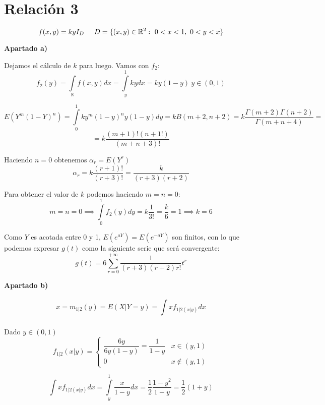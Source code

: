 \documentclass[openany]{book}
\begin{document}
\chapter{Relación 3}

\begin{exercise}
    $$ f (x,y) = k y I_{D}\hspace{5mm} D = \{(x,y) \in \mathbb{R}^2:\ 0<x<1,\ 0<y<x\} $$
    
    \begin{flushright}
        \textbf{Apartado a)}
    \end{flushright}


    Dejamos el cálculo de $ k $ para luego. Vamos con $ f_{2} $:
    $$ f_{2}(y) = \int\limits_{\mathbb{R}}^{}f(x,y)dx = \int\limits_{y}^{1} ky dx = ky(1-y)\ y \in (0,1) $$

    $$ E(Y^{m}(1-Y)^{n}) = \int\limits_{0}^{1}k y ^{m}(1-y)^{n} y (1-y)dy = kB(m+2,n+2) = k \dfrac{\Gamma(m+2)\Gamma(n+2)}{\Gamma(m+n+4)} = $$
    $$ = k \dfrac{(m+1)!(n+1!)}{(m+n+3)!} $$

    Haciendo $ n = 0 $ obtenemos $ \alpha_{r} = E(Y^{r}) $
    $$ \alpha_{r} = k \dfrac{(r+1)!}{(r+3)!} = \dfrac{k}{(r+3)(r+2)} $$

    Para obtener el valor de $ k $ podemos haciendo $ m = n = 0 $:
    $$ m = n = 0 \implies \int\limits_{0}^{1} f_{2}(y)dy = k \dfrac{1}{3!} = \dfrac{k}{6} = 1 \implies k = 6 $$

    Como $ Y $ es acotada entre 0 y 1, $ E(e^{aY}) = E(e^{-aY}) $ son finitos, con lo que podemos expresar $ g(t) $ como la siguiente serie que será convergente:
    $$ g(t) = 6\sum\limits_{r=0}^{+\infty} \dfrac{1}{(r+3)(r+2)r!} t ^{r} $$


    \begin{flushright}
        \textbf{Apartado b)}
    \end{flushright}


    $$ x = m_{1|2}(y) = E(X|Y = y) = \int\limits_{}^{} x f_{1|2(x|y)}dx $$

    Dado $ y \in (0,1) $
    $$ f_{1|2}(x|y) = \left\{
    \begin{array}{lr}
        \dfrac{6y}{6y(1-y)} = \dfrac{1}{1-y} & x \in (y,1)\\ 
        0 & x \not \in (y,1)
    \end{array}
    \right.$$

    $$ \int\limits_{}^{} x f_{1|2(x|y)}dx = \int\limits_{y}^{1} \dfrac{x}{1-y}dx = \dfrac{1}{2} \dfrac{1-y^2}{1-y} = \dfrac{1}{2}(1+y) $$
    

\end{exercise}
\end{document}
